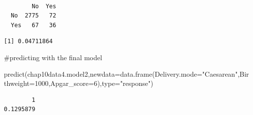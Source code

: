 \documentclass[
  letterpaper,
  DIV=11,
  numbers=noendperiod]{scrartcl}
\newenvironment{Shaded}{\begin{snugshade}}{\end{snugshade}}
\newcommand{\AttributeTok}[1]{\textcolor[rgb]{0.40,0.45,0.13}{#1}}
\newcommand{\DecValTok}[1]{\textcolor[rgb]{0.68,0.00,0.00}{#1}}
\newcommand{\FloatTok}[1]{\textcolor[rgb]{0.68,0.00,0.00}{#1}}
\newcommand{\FunctionTok}[1]{\textcolor[rgb]{0.28,0.35,0.67}{#1}}
\newcommand{\NormalTok}[1]{\textcolor[rgb]{0.00,0.23,0.31}{#1}}
\newcommand{\OtherTok}[1]{\textcolor[rgb]{0.00,0.23,0.31}{#1}}
\newcommand{\SpecialCharTok}[1]{\textcolor[rgb]{0.37,0.37,0.37}{#1}}
\newcommand{\StringTok}[1]{\textcolor[rgb]{0.13,0.47,0.30}{#1}}
\begin{document}
\begin{Shaded}
\end{Shaded}

\begin{verbatim}
     
        No  Yes
  No  2775   72
  Yes   67   36
\end{verbatim}

\begin{Shaded}
\end{Shaded}

\begin{verbatim}
[1] 0.04711864
\end{verbatim}

\#predicting with the final model

\begin{Shaded}
\begin{Highlighting}[]
\FunctionTok{predict}\NormalTok{(chap10data4.model2,}\AttributeTok{newdata=}\FunctionTok{data.frame}\NormalTok{(}\AttributeTok{Delivery.mode=}\StringTok{"Caesarean"}\NormalTok{,}\AttributeTok{Birthweight=}\DecValTok{1000}\NormalTok{,}\AttributeTok{Apgar\_score=}\DecValTok{6}\NormalTok{),}\AttributeTok{type=}\StringTok{"response"}\NormalTok{)}
\end{Highlighting}
\end{Shaded}

\begin{verbatim}
        1 
0.1295879 
\end{verbatim}
\end{document}
